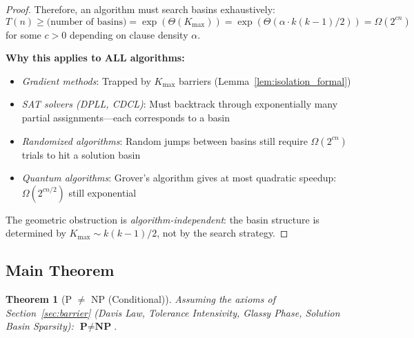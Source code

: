 \documentclass[11pt,a4paper]{article}
\theoremstyle{plain}
\newtheorem{theorem}{Theorem}[section]
\theoremstyle{definition}
\theoremstyle{remark}
\newcommand{\NP}{\textbf{NP}}
\newcommand{\PP}{\textbf{P}}
\begin{document}
\begin{proof}
Therefore, an algorithm must search basins exhaustively:
\begin{equation}
    T(n) \geq \text{(number of basins)} = \exp(\Theta(K_{\max})) = \exp(\Theta(\alpha \cdot k(k-1)/2)) = \Omega(2^{cn})
\end{equation}
for some $c > 0$ depending on clause density $\alpha$.

\textbf{Why this applies to ALL algorithms:}
\begin{itemize}
    \item \emph{Gradient methods}: Trapped by $K_{\max}$ barriers (Lemma~\ref{lem:isolation_formal})
    \item \emph{SAT solvers (DPLL, CDCL)}: Must backtrack through exponentially many partial assignments---each corresponds to a basin
    \item \emph{Randomized algorithms}: Random jumps between basins still require $\Omega(2^{cn})$ trials to hit a solution basin
    \item \emph{Quantum algorithms}: Grover's algorithm gives at most quadratic speedup: $\Omega(2^{cn/2})$ still exponential
\end{itemize}

The geometric obstruction is \emph{algorithm-independent}: the basin structure is determined by $K_{\max} \sim k(k-1)/2$, not by the search strategy.
\end{proof}

\subsection{Main Theorem}

\begin{theorem}[P $\neq$ NP (Conditional)]\label{thm:main_formal}
Assuming the axioms of Section~\ref{sec:barrier} (Davis Law, Tolerance Intensivity, Glassy Phase, Solution Basin Sparsity): $\PP \neq \NP$.
\end{theorem}
\end{document}
